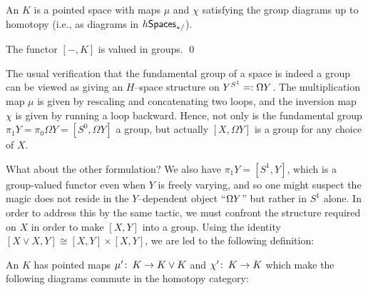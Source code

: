 \begin{definition}
An  $K$ is a pointed space with maps $\mu$ and $\chi$ satisfying the group diagrams up to homotopy (i.e., as diagrams in $h\mathsf{Spaces}_{*/}$).
\end{definition}

\begin{corollary}
The functor $[-, K]$ is valued in groups. \qed
\end{corollary}

\begin{example}
The usual verification that the fundamental group of a space is indeed a group can be viewed as giving an $H$--space structure on $Y^{S^1} =: \Omega Y$.
The multiplication map $\mu$ is given by rescaling and concatenating two loops, and the inversion map $\chi$ is given by running a loop backward.
Hence, not only is the fundamental group $\pi_1 Y = \pi_0 \Omega Y = [S^0, \Omega Y]$ a group, but actually $[X, \Omega Y]$ is a group for any choice of $X$.
\end{example}

What about the other formulation?
We also have $\pi_1 Y = [S^1, Y]$, which is a group-valued functor even when $Y$ is freely varying, and so one might suspect the magic does not reside in the $Y$--dependent object ``$\Omega Y$'' but rather in $S^1$ alone.
In order to address this by the same tactic, we must confront the structure required on $X$ in order to make $[X, Y]$ into a group.
Using the identity $[X \vee X, Y] \cong [X, Y] \times [X, Y]$, we are led to the following definition:

\begin{definition}
An  $K$ has pointed maps $\mu'\colon\thinspace K \to K \vee K$ and $\chi'\colon\thinspace K \to K$ which make the following diagrams commute in the homotopy category:
\begin{center}
\end{center}
\end{definition}

